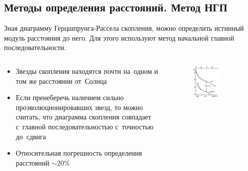 \documentclass{beamer}
\begin{document}
    \subsection{Методы определения расстояний. Метод НГП}
    \begin{frame}
        Зная диаграмму Герцшпрунга-Рассела скопления, можно определить истинный модуль расстояния до него. Для этого используют метод начальной главной последовательности.
        \begin{columns}
            \begin{column}{0.6\textwidth}
                \begin{itemize}
                    \item Звезды скопления находятся почти на~одном и том же расстоянии от~Солнца
                    \item Если пренеберечь наличием сильно проэволюционировавших звезд, то можно считать, 
                    что диаграмма скопления совпадает с~главной последовательностью с~точностью до~сдвига
                    \item Относительная погрешность определения расстояний $\sim 20$\%
                \end{itemize}
            \end{column}
            \begin{column}{0.4\textwidth}
                \begin{figure}
                \centering
                    \includegraphics[width=0.6\textwidth]{pictures/NGP.jpg}
                \end{figure}
            \end{column}
        \end{columns}

    \end{frame}
\end{document}
